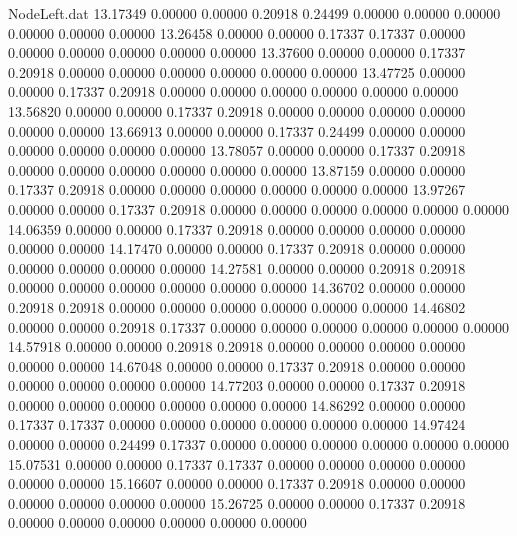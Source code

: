 \begin{filecontents}{NodeLeft.dat}
  13.17349    0.00000    0.00000     0.20918    0.24499    0.00000    0.00000    0.00000    0.00000    0.00000    0.00000
  13.26458    0.00000    0.00000     0.17337    0.17337    0.00000    0.00000    0.00000    0.00000    0.00000    0.00000
  13.37600    0.00000    0.00000     0.17337    0.20918    0.00000    0.00000    0.00000    0.00000    0.00000    0.00000
  13.47725    0.00000    0.00000     0.17337    0.20918    0.00000    0.00000    0.00000    0.00000    0.00000    0.00000
  13.56820    0.00000    0.00000     0.17337    0.20918    0.00000    0.00000    0.00000    0.00000    0.00000    0.00000
  13.66913    0.00000    0.00000     0.17337    0.24499    0.00000    0.00000    0.00000    0.00000    0.00000    0.00000
  13.78057    0.00000    0.00000     0.17337    0.20918    0.00000    0.00000    0.00000    0.00000    0.00000    0.00000
  13.87159    0.00000    0.00000     0.17337    0.20918    0.00000    0.00000    0.00000    0.00000    0.00000    0.00000
  13.97267    0.00000    0.00000     0.17337    0.20918    0.00000    0.00000    0.00000    0.00000    0.00000    0.00000
  14.06359    0.00000    0.00000     0.17337    0.20918    0.00000    0.00000    0.00000    0.00000    0.00000    0.00000
  14.17470    0.00000    0.00000     0.17337    0.20918    0.00000    0.00000    0.00000    0.00000    0.00000    0.00000
  14.27581    0.00000    0.00000     0.20918    0.20918    0.00000    0.00000    0.00000    0.00000    0.00000    0.00000
  14.36702    0.00000    0.00000     0.20918    0.20918    0.00000    0.00000    0.00000    0.00000    0.00000    0.00000
  14.46802    0.00000    0.00000     0.20918    0.17337    0.00000    0.00000    0.00000    0.00000    0.00000    0.00000
  14.57918    0.00000    0.00000     0.20918    0.20918    0.00000    0.00000    0.00000    0.00000    0.00000    0.00000
  14.67048    0.00000    0.00000     0.17337    0.20918    0.00000    0.00000    0.00000    0.00000    0.00000    0.00000
  14.77203    0.00000    0.00000     0.17337    0.20918    0.00000    0.00000    0.00000    0.00000    0.00000    0.00000
  14.86292    0.00000    0.00000     0.17337    0.17337    0.00000    0.00000    0.00000    0.00000    0.00000    0.00000
  14.97424    0.00000    0.00000     0.24499    0.17337    0.00000    0.00000    0.00000    0.00000    0.00000    0.00000
  15.07531    0.00000    0.00000     0.17337    0.17337    0.00000    0.00000    0.00000    0.00000    0.00000    0.00000
  15.16607    0.00000    0.00000     0.17337    0.20918    0.00000    0.00000    0.00000    0.00000    0.00000    0.00000
  15.26725    0.00000    0.00000     0.17337    0.20918    0.00000    0.00000    0.00000    0.00000    0.00000    0.00000

\end{filecontents}
